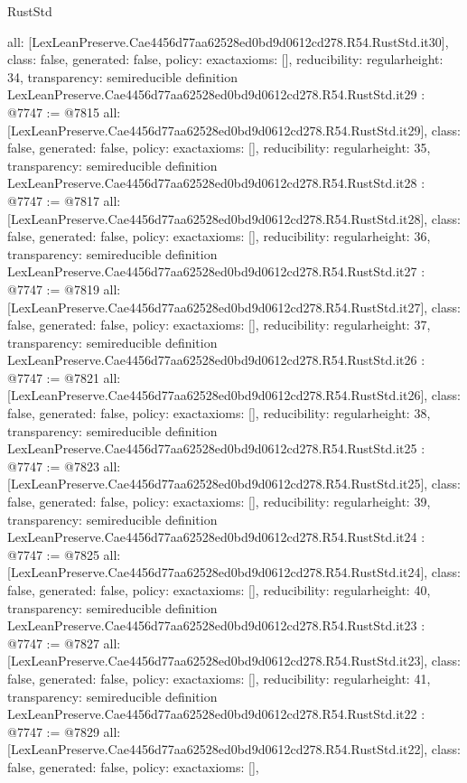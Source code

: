 \begin{lexlean}{RustStd}
\begin{coremodule}
{  all: [LexLeanPreserve.Cae4456d77aa62528ed0bd9d0612cd278.R54.RustStd.it30],
  class: false,
  generated: false,
  policy: exact{axioms: []},
  reducibility: regular{height: 34},
  transparency: semireducible
}
definition LexLeanPreserve.Cae4456d77aa62528ed0bd9d0612cd278.R54.RustStd.it29 : @7747 := @7815 {
  all: [LexLeanPreserve.Cae4456d77aa62528ed0bd9d0612cd278.R54.RustStd.it29],
  class: false,
  generated: false,
  policy: exact{axioms: []},
  reducibility: regular{height: 35},
  transparency: semireducible
}
definition LexLeanPreserve.Cae4456d77aa62528ed0bd9d0612cd278.R54.RustStd.it28 : @7747 := @7817 {
  all: [LexLeanPreserve.Cae4456d77aa62528ed0bd9d0612cd278.R54.RustStd.it28],
  class: false,
  generated: false,
  policy: exact{axioms: []},
  reducibility: regular{height: 36},
  transparency: semireducible
}
definition LexLeanPreserve.Cae4456d77aa62528ed0bd9d0612cd278.R54.RustStd.it27 : @7747 := @7819 {
  all: [LexLeanPreserve.Cae4456d77aa62528ed0bd9d0612cd278.R54.RustStd.it27],
  class: false,
  generated: false,
  policy: exact{axioms: []},
  reducibility: regular{height: 37},
  transparency: semireducible
}
definition LexLeanPreserve.Cae4456d77aa62528ed0bd9d0612cd278.R54.RustStd.it26 : @7747 := @7821 {
  all: [LexLeanPreserve.Cae4456d77aa62528ed0bd9d0612cd278.R54.RustStd.it26],
  class: false,
  generated: false,
  policy: exact{axioms: []},
  reducibility: regular{height: 38},
  transparency: semireducible
}
definition LexLeanPreserve.Cae4456d77aa62528ed0bd9d0612cd278.R54.RustStd.it25 : @7747 := @7823 {
  all: [LexLeanPreserve.Cae4456d77aa62528ed0bd9d0612cd278.R54.RustStd.it25],
  class: false,
  generated: false,
  policy: exact{axioms: []},
  reducibility: regular{height: 39},
  transparency: semireducible
}
definition LexLeanPreserve.Cae4456d77aa62528ed0bd9d0612cd278.R54.RustStd.it24 : @7747 := @7825 {
  all: [LexLeanPreserve.Cae4456d77aa62528ed0bd9d0612cd278.R54.RustStd.it24],
  class: false,
  generated: false,
  policy: exact{axioms: []},
  reducibility: regular{height: 40},
  transparency: semireducible
}
definition LexLeanPreserve.Cae4456d77aa62528ed0bd9d0612cd278.R54.RustStd.it23 : @7747 := @7827 {
  all: [LexLeanPreserve.Cae4456d77aa62528ed0bd9d0612cd278.R54.RustStd.it23],
  class: false,
  generated: false,
  policy: exact{axioms: []},
  reducibility: regular{height: 41},
  transparency: semireducible
}
definition LexLeanPreserve.Cae4456d77aa62528ed0bd9d0612cd278.R54.RustStd.it22 : @7747 := @7829 {
  all: [LexLeanPreserve.Cae4456d77aa62528ed0bd9d0612cd278.R54.RustStd.it22],
  class: false,
  generated: false,
  policy: exact{axioms: []},
}
\end{coremodule}
\end{lexlean}
